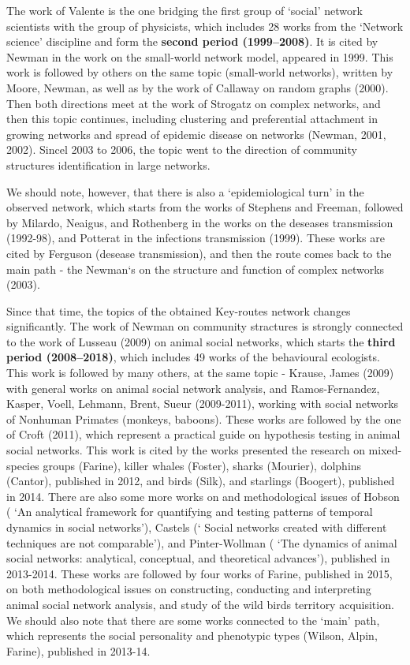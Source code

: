 \documentclass[11pt]{article} %
\begin{document}
The work of Valente is the one bridging the first group of `social' network scientists with the group of physicists, which includes 28 works from the `Network science' discipline and form the \textbf{second period (1999--2008)}. It is cited by Newman in the work on the small-world network model, appeared in 1999. This work is followed by others on the same topic (small-world networks), written by Moore, Newman, as well as by the work of Callaway on random graphs (2000). Then both directions meet at the work of Strogatz on complex networks, and then this topic continues, including 
clustering and preferential attachment in growing networks and spread of epidemic disease on networks (Newman, 2001, 2002). Sincel 2003 to 2006, the topic went to the direction of community structures identification in large networks. \medskip 
 
We should note, however, that there is also a `epidemiological turn' in the observed network, which starts from the works of Stephens and Freeman, followed by Milardo, Neaigus, and Rothenberg in the works on the deseases transmission (1992-98), and Potterat in the infections transmission (1999). These works are cited by Ferguson (desease transmission), and then the route comes back to the main path - the Newman`s on the structure and function of complex networks (2003). \medskip 

 Since that time, the topics of the obtained Key-routes network changes significantly. The work of Newman on community stractures is strongly connected to the work of Lusseau (2009) on animal social networks, which starts the \textbf{third period (2008--2018)}, which includes 49 works of the behavioural ecologists. This work is followed by many others, at the same topic - Krause, James (2009) with general works on animal social network analysis, and Ramos-Fernandez, Kasper, Voell, Lehmann, Brent, Sueur (2009-2011), working with social networks of Nonhuman Primates (monkeys, baboons). These works are followed by the one of Croft (2011), which represent a practical guide on  hypothesis testing in animal social networks. This work is cited by the works presented the research on mixed-species groups (Farine), killer whales (Foster), sharks (Mourier), dolphins (Cantor), published in 2012, and birds (Silk), and starlings (Boogert), published in 2014. There are also some more works on and methodological issues of Hobson ( `An analytical framework for quantifying and testing patterns of temporal dynamics in social networks'), Castels (` Social networks created with different techniques are not comparable'), and Pinter-Wollman ( `The dynamics of animal social networks: analytical, conceptual, and theoretical advances'), published in 2013-2014. These works are followed by four works of Farine, published in 2015, on both methodological issues on constructing, conducting and interpreting animal social network analysis, and study of the wild birds territory acquisition. We should also note that there are some works connected to the `main' path, which represents the social personality and phenotypic types (Wilson, Alpin, Farine), published in 2013-14.\medskip   
 
\end{document}
